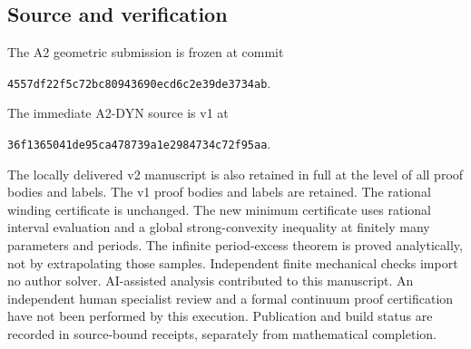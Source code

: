 \subsection*{Source and verification}
The A2 geometric submission is frozen at commit
\begin{center}\small\texttt{4557df22f5c72bc80943690ecd6c2e39de3734ab}.\end{center} The immediate A2-DYN
source is v1 at
\begin{center}\small\texttt{36f1365041de95ca478739a1e2984734c72f95aa}.\end{center}
The locally delivered v2 manuscript is also retained in full at the level
of all proof bodies and labels. The v1 proof bodies and labels are retained. The rational winding certificate is unchanged.
The new minimum certificate uses rational interval evaluation and a global
strong-convexity inequality at finitely many parameters and periods. The
infinite period-excess theorem is proved analytically, not by extrapolating
those samples. Independent finite mechanical checks import no author solver.
AI-assisted analysis contributed to this manuscript. An independent human
specialist review and a formal continuum proof certification have not been
performed by this execution. Publication and build status are recorded in
source-bound receipts, separately from mathematical completion.
